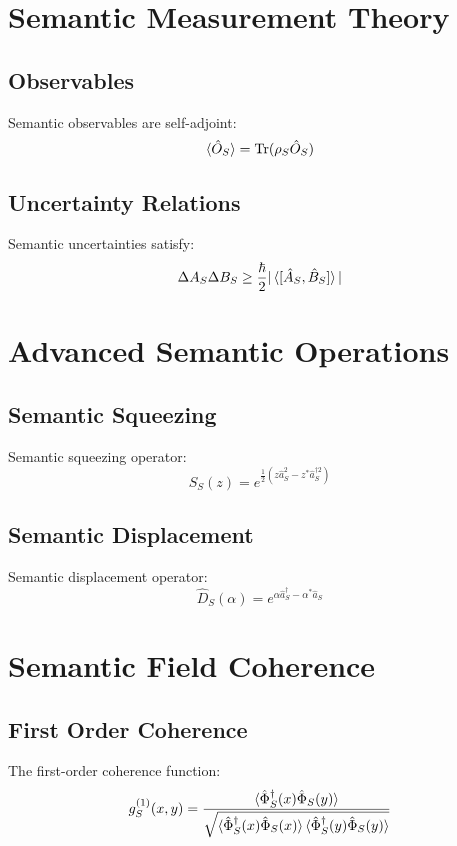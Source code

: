 \documentclass[12pt]{article}
\begin{document}
\section{Semantic Measurement Theory}
\subsection{Observables}
Semantic observables are self-adjoint:
\begin{equation}
\braket{\hat{O}_S} = \text{Tr}(\rho_S\hat{O}_S)
\end{equation}
\subsection{Uncertainty Relations}
Semantic uncertainties satisfy:
\begin{equation}
\Delta A_S\Delta B_S \geq \frac{\hbar}{2}|\braket{[\hat{A}_S,\hat{B}_S]}|
\end{equation}
\section{Advanced Semantic Operations}
\subsection{Semantic Squeezing}
Semantic squeezing operator:
\begin{equation}
\hat{S}_S(z) = e^{\frac{1}{2}(z\hat{a}_S^2 - z^*\hat{a}_S^{\dagger 2})}
\end{equation}
\subsection{Semantic Displacement}
Semantic displacement operator:
\begin{equation}
\hat{D}_S(\alpha) = e^{\alpha\hat{a}_S^\dagger - \alpha^*\hat{a}_S}
\end{equation}
\section{Semantic Field Coherence}
\subsection{First Order Coherence}
The first-order coherence function:
\begin{equation}
g_S^{(1)}(x,y) = \frac{\braket{\hat{\Phi}_S^\dagger(x)\hat{\Phi}_S(y)}}{\sqrt{\braket{\hat{\Phi}_S^\dagger(x)\hat{\Phi}_S(x)}\braket{\hat{\Phi}_S^\dagger(y)\hat{\Phi}_S(y)}}}
\end{equation}
\end{document}
